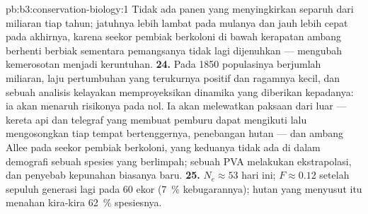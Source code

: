 \begin{solution}{pb:b3:conservation-biology:1}
Tidak ada panen yang menyingkirkan separuh dari miliaran tiap tahun;
jatuhnya lebih lambat pada mulanya dan jauh lebih cepat pada akhirnya,
karena seekor pembiak berkoloni di bawah kerapatan ambang berhenti berbiak
sementara pemangsanya tidak lagi dijenuhkan ---  mengubah
kemerosotan menjadi keruntuhan.
\textbf{24.} Pada 1850 populasinya berjumlah miliaran, laju pertumbuhan
yang terukurnya positif dan ragamnya kecil, dan sebuah analisis kelayakan
memproyeksikan dinamika yang diberikan kepadanya: ia akan menaruh
risikonya pada nol. Ia akan melewatkan paksaan dari luar --- kereta api
dan telegraf yang membuat pemburu dapat mengikuti lalu mengosongkan tiap
tempat bertenggernya, penebangan hutan --- dan ambang Allee pada seekor
pembiak berkoloni, yang keduanya tidak ada di dalam demografi sebuah
spesies yang berlimpah; sebuah PVA melakukan ekstrapolasi, dan penyebab
kepunahan biasanya baru.
\textbf{25.} $N_{e} \approx 53$ hari ini; $F \approx 0.12$ setelah sepuluh
generasi lagi pada 60 ekor (\qty{7}{\%} kebugarannya); hutan yang menyusut
itu menahan kira-kira \qty{62}{\%} spesiesnya.
\end{solution}
